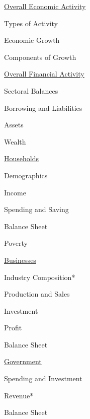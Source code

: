 \documentclass{report}
\begin{document}
\begin{minipage}{0.4\textwidth}
\begin{description}
\item {\hyperref[sec:oea]{Overall Economic Activity}}
\begin{description}
\item Types of Activity
\item Economic Growth
\item Components of Growth
\end{description}
\item {\hyperref[sec:ofa]{Overall Financial Activity}}
\begin{description}
\item Sectoral Balances
\item Borrowing and Liabilities
\item Assets
\item Wealth
\end{description}
\item {\hyperref[sec:hh]{Households}}
\begin{description}
\item Demographics
\item Income
\item Spending and Saving
\item Balance Sheet
\item Poverty
\end{description}
\item {\hyperref[sec:bus]{Businesses}}
\begin{description}
\item Industry Composition*
\item Production and Sales
\item Investment
\item Profit
\item Balance Sheet
\end{description}
\item {\hyperref[sec:gov]{Government}}
\begin{description}
\item Spending and Investment
\item Revenue*
\item Balance Sheet
\end{description}
\end{description}
\end{minipage} \hspace{12mm} 
\end{document}
